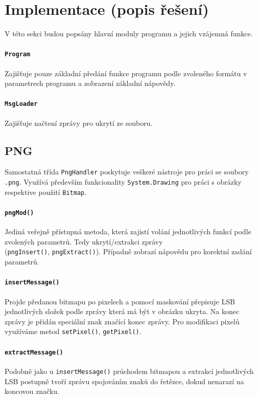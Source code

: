 \documentclass[12pt]{article}
\begin{document}
\pagebreak
\section{Implementace (popis řešení)}
V této sekci budou popsány hlavní moduly programu a jejich vzájemná funkce.

\paragraph{\texttt{Program}}
Zajišťuje pouze základní předání funkce programu podle zvoleného formátu v parametrech programu a zobrazení základní nápovědy.

\paragraph{\texttt{MsgLoader}}
Zajišťuje načtení zprávy pro ukrytí ze souboru.

\subsection{PNG}
Samostatná třída \texttt{PngHandler} poskytuje veškeré nástroje pro práci se soubory \texttt{.png}. Využívá především funkcionality \texttt{System.Drawing} pro práci s obrázky respektive použití \texttt{Bitmap}.

\paragraph{\texttt{pngMod()}}
Jediná veřejně přístupná metoda, která zajistí volání jednotlivých funkcí podle zvolených parametrů. Tedy ukrytí/extrakci zprávy \\ (\texttt{pngInsert()}, \texttt{pngExtract()}). Případně zobrazí nápovědu pro korektní zadání parametrů.

\paragraph{\texttt{insertMessage()}}
Projde předanou bitmapu po pixelech a pomocí maskování přepisuje LSB jednotlivých složek podle zprávy která má být v obrázku ukryta. Na konec zprávy je přidán speciální znak značící konec zprávy. Pro modifikaci pixelů využíváme metod \texttt{setPixel()}, \texttt{getPixel()}.

\paragraph{\texttt{extractMessage()}}
Podobně jako u \texttt{insertMessage()} průchodem bitmapou a extrakcí jednotlivých LSB postupně tvoří zprávu spojováním znaků do řetězce, dokud nenarazí na koncovou značku.
\end{document}
